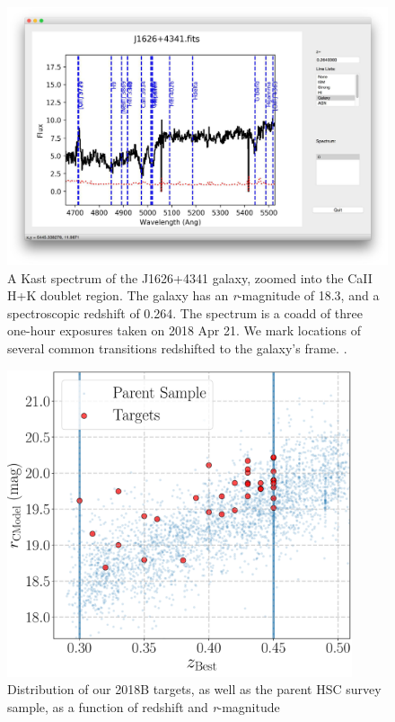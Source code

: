 \documentclass[letterpaper,12pt]{article}
\begin{document}
\begin{figure}[hbt]
\includegraphics[width=\textwidth]{J1626.pdf}
\caption{
A Kast spectrum of the J1626+4341 galaxy, zoomed into the CaII H+K doublet region. The galaxy has an {\it r}-magnitude 
of 18.3, and a spectroscopic redshift of 0.264. The spectrum is a coadd of three one-hour exposures taken on 2018 Apr 21. 
We mark locations of several common transitions redshifted to the galaxy's frame. 
.}
\label{spectrum}
\end{figure}

\begin{figure}
\includegraphics[width=4in]{s16a_massive_photoz_pair_gama_kast_targets.pdf}
\caption{
Distribution of our 2018B targets, as well as the parent HSC survey sample, as a function of redshift and {\it r}-magnitude}
\end{figure}
\end{document}
